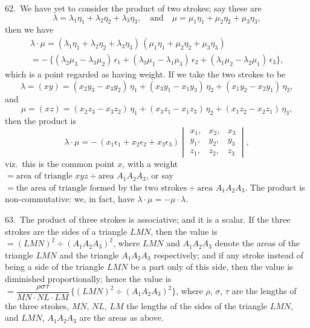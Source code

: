 \documentclass[12pt,a4paper]{article}
\theoremstyle{definition}
\begin{document}
62.\ We have yet to consider the product of two strokes; say these are
\[
\lambda = \lambda_1 \eta_1 + \lambda_2 \eta_2 + \lambda_3 \eta_3, \quad \text{and} \quad
\mu = \mu_1 \eta_1 + \mu_2 \eta_2 + \mu_3 \eta_3,
\]
then we have
\begin{multline*}
\lambda \cdot \mu
= (\lambda_1 \eta_1 + \lambda_2 \eta_2 + \lambda_3 \eta_3)\,
(\mu_1 \eta_1 + \mu_2 \eta_2 + \mu_3 \eta_3)\\
= -\, \{(\lambda_2 \mu_3 - \lambda_3 \mu_2)\, \epsilon_1
+ (\lambda_3 \mu_1 - \lambda_1 \mu_3)\, \epsilon_2
+ (\lambda_1 \mu_2 - \lambda_2 \mu_1)\, \epsilon_3\},
\end{multline*}
which is a point regarded as having weight. If we take the two strokes to be
\[
\lambda = (xy) = (x_2 y_3 - x_3 y_2)\, \eta_1 + (x_3 y_1 - x_1 y_3)\, \eta_2 + (x_1 y_2 - x_2 y_1)\, \eta_3,
\]
and
\[
\mu = (xz) = (x_2 z_3 - x_3 z_2)\, \eta_1 + (x_3 z_1 - x_1 z_3)\, \eta_2 + (x_1 z_2 - x_2 z_1)\, \eta_3,
\]
then the product is
\[
\lambda \cdot \mu = -\, (x_1 \epsilon_1 + x_2 \epsilon_2 + x_3 \epsilon_3)
\begin{vmatrix}
x_1, & x_2, & x_3 \\
y_1, & y_2, & y_3 \\
z_1, & z_2, & z_3
\end{vmatrix},
\]
viz.\ this is the common point $x$, with a weight $= \text{area of triangle } xyz \div \text{area } A_1 A_2 A_3$,
or say $= \text{the area of triangle formed by the two strokes} \div \text{area } A_1 A_2 A_3$.
The product is non-commutative: we, in fact, have $\lambda \cdot \mu = -\mu \cdot \lambda$.

63.\ The product of three strokes is associative; and it is a scalar. If the three
strokes are the sides of a triangle $LMN$, then the value is $= (LMN)^2 \div (A_1 A_2 A_3)^2$,
where $LMN$ and $A_1 A_2 A_3$ denote the areas of the triangle $LMN$ and the triangle
$A_1 A_2 A_3$ respectively; and if any stroke instead of being a side of the triangle $LMN$
be a part only of this side, then the value is diminished proportionally; hence the value is
$= \dfrac{\rho \sigma \tau}{MN \cdot NL \cdot LM}\, \{(LMN)^2 \div (A_1 A_2 A_3)^2\}$,
where $\rho$, $\sigma$, $\tau$ are the lengths of the three strokes, $MN$, $NL$, $LM$ the lengths
of the sides of the triangle $LMN$, and $LMN$, $A_1 A_2 A_3$ are the areas as above.
\end{document}

